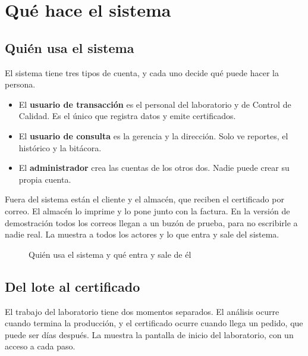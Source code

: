 \FloatBarrier
\section{Qué hace el sistema}\label{sec:producto}

\subsection{Quién usa el sistema}\label{sec:roles}

El sistema tiene tres tipos de cuenta, y cada uno decide qué puede hacer la persona.

\begin{itemize}
  \item El \textbf{usuario de transacción} es el personal del laboratorio y de Control de Calidad. Es el único que registra datos y emite certificados.
  \item El \textbf{usuario de consulta} es la gerencia y la dirección. Solo ve reportes, el histórico y la bitácora.
  \item El \textbf{administrador} crea las cuentas de los otros dos. Nadie puede crear su propia cuenta.
\end{itemize}

Fuera del sistema están el cliente y el almacén, que reciben el certificado por correo. El almacén lo imprime y lo pone junto con la factura. En la versión de demostración todos los correos llegan a un buzón de prueba, para no escribirle a nadie real. La  muestra a todos los actores y lo que entra y sale del sistema.

\begin{figure}[H]
  \centering
  \resizebox{\linewidth}{!}{}
  \caption{Quién usa el sistema y qué entra y sale de él}\label{fig:contexto}
\end{figure}

\subsection{Del lote al certificado}\label{sec:flujo}

El trabajo del laboratorio tiene dos momentos separados. El análisis ocurre cuando termina la producción, y el certificado ocurre cuando llega un pedido, que puede ser días después. La  muestra la pantalla de inicio del laboratorio, con un acceso a cada paso.

